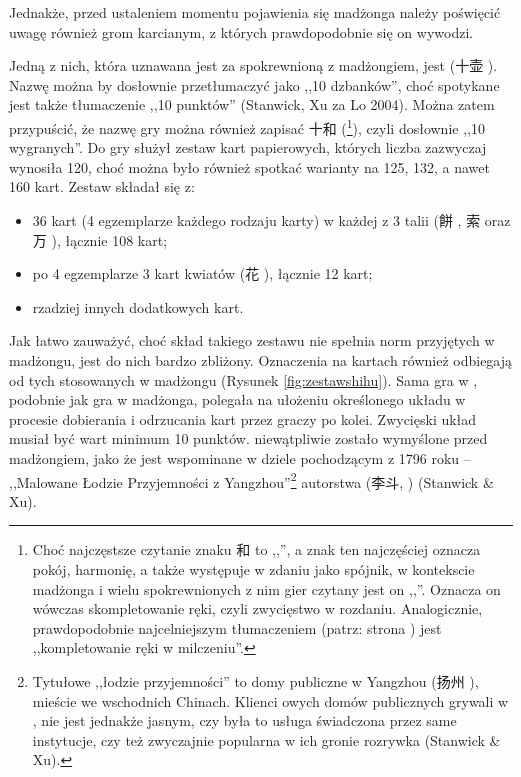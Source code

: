 Jednakże, przed ustaleniem momentu pojawienia się madżonga należy poświęcić
uwagę również grom karcianym, z których prawdopodobnie się on wywodzi.

Jedną z nich, która uznawana jest za spokrewnioną z madżongiem, jest
 (十壶 ). Nazwę można by dosłownie przetłumaczyć jako
,,10 dzbanków'', choć spotykane jest także tłumaczenie ,,10 punktów'' (Stanwick,
Xu za Lo 2004). Można zatem przypuścić, że nazwę gry można również zapisać 十和
(\footnote{Choć najczęstsze czytanie znaku 和 to ,,'', a
znak ten najczęściej oznacza pokój, harmonię, a także występuje w zdaniu jako
spójnik, w kontekscie madżonga i wielu spokrewnionych z nim gier czytany jest on
,,''. Oznacza on wówczas skompletowanie ręki, czyli zwycięstwo w
rozdaniu. Analogicznie, prawdopodobnie najcelniejszym tłumaczeniem 
(patrz: strona \pageref{mohu_page}) jest ,,kompletowanie ręki w milczeniu''.}),
czyli dosłownie ,,10 wygranych''. Do gry służył zestaw kart papierowych, których
liczba zazwyczaj wynosiła 120, choć można było również spotkać warianty na 125,
132, a nawet 160 kart. Zestaw składał się z:
\begin{itemize}
  \item 36 kart (4 egzemplarze każdego rodzaju karty) w każdej z 3 talii (餅
  , 索  oraz 万 ), łącznie 108 kart;
  \item po 4 egzemplarze 3 kart kwiatów (花 ), łącznie 12 kart;
  \item rzadziej innych dodatkowych kart.
\end{itemize}
Jak łatwo zauważyć, choć skład takiego zestawu nie spełnia norm przyjętych w
madżongu, jest do nich bardzo zbliżony. Oznaczenia na kartach również odbiegają
od tych stosowanych w madżongu (Rysunek \ref{fig:zestawshihu}).
Sama gra w , podobnie jak gra w madżonga, polegała na ułożeniu określonego układu w procesie
dobierania i odrzucania kart przez graczy po kolei. Zwycięski układ musiał być
wart minimum 10 punktów.  niewątpliwie zostało wymyślone przed
madżongiem, jako że jest wspominane w dziele pochodzącym z 1796 roku --
,,Malowane Łodzie Przyjemności z Yangzhou''\footnote{Tytułowe ,,łodzie
przyjemności'' to domy publiczne w Yangzhou (扬州 ), mieście we
wschodnich Chinach. Klienci owych domów publicznych grywali w ,
nie jest jednakże jasnym, czy była to usługa świadczona przez same instytucje,
czy też zwyczajnie popularna w ich gronie rozrywka (Stanwick \& Xu).}
autorstwa  (李斗, ) (Stanwick \& Xu).


